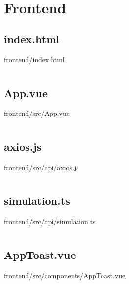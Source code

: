 \section{Frontend}
\makeatletter
\subsection*{index.html}
frontend/index.html
\def\@currentlabelname{index.html}
\label{code:frontend:index.html}
\makeatother

\inputminted[linenos,breaklines,tabsize=2]{html}{/Users/Henry/Desktop/NEAComputerScience/frontend/index.html}

\makeatletter
\subsection*{App.vue}
frontend/src/App.vue
\def\@currentlabelname{App.vue}
\label{code:frontend:src:App.vue}
\makeatother

\inputminted[linenos,breaklines,tabsize=2]{vue}{/Users/Henry/Desktop/NEAComputerScience/frontend/src/App.vue}

\makeatletter
\subsection*{axios.js}
frontend/src/api/axios.js
\def\@currentlabelname{axios.js}
\label{code:frontend:src:api:axios.js}
\makeatother

\inputminted[linenos,breaklines,tabsize=2]{javascript}{/Users/Henry/Desktop/NEAComputerScience/frontend/src/api/axios.js}

\makeatletter
\subsection*{simulation.ts}
frontend/src/api/simulation.ts
\def\@currentlabelname{simulation.ts}
\label{code:frontend:src:api:simulation.ts}
\makeatother

\inputminted[linenos,breaklines,tabsize=2]{typescript}{/Users/Henry/Desktop/NEAComputerScience/frontend/src/api/simulation.ts}

\makeatletter
\subsection*{AppToast.vue}
frontend/src/components/AppToast.vue
\def\@currentlabelname{AppToast.vue}
\label{code:frontend:src:components:AppToast.vue}
\makeatother

